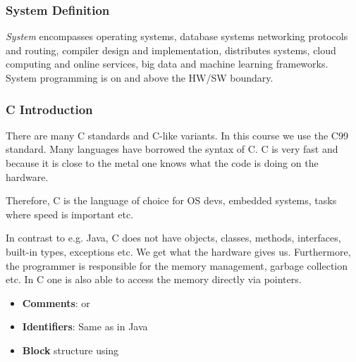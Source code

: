 

\subsubsection{System Definition}
\textit{System} encompasses operating systems, database systems networking protocols and routing, compiler design and implementation, distributes systems, cloud computing and online services, big data and machine learning frameworks. System programming is on and above the HW/SW boundary.

\subsubsection{C Introduction}
There are many C standards and C-like variants. In this course we use the C99 standard. Many languages have borrowed the syntax of C. C is very fast and because it is close to the metal one knows what the code is doing on the hardware.

Therefore, C is the language of choice for OS devs, embedded systems, tasks where speed is important etc.

In contrast to e.g. Java, C does not have objects, classes, methods, interfaces, built-in types, exceptions etc. We get what the hardware gives us. Furthermore, the programmer is responsible for the memory management, garbage collection etc. In C one is also able to access the memory directly via pointers.

\begin{itemize}
    \item \textbf{Comments}:  or \code{//}
    \item \textbf{Identifiers}: Same as in Java
    \item \textbf{Block} structure using 
\end{itemize}
